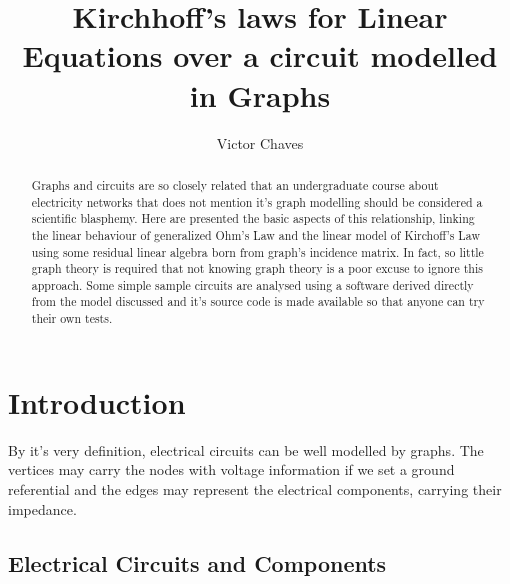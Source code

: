 \documentclass{comjnl}
\begin{document}
\title[Kirchhoff's laws for Linear Equations over a circuit modelled in Graphs]{Kirchhoff's laws for Linear Equations over a circuit modelled in Graphs}
\author{Victor Chaves}
 






\begin{abstract}
Graphs and circuits are so closely related that an undergraduate course about electricity networks that does not mention it's graph modelling should be considered a scientific blasphemy. Here are presented the basic aspects of this relationship, linking the linear behaviour of generalized Ohm's Law and the linear model of Kirchoff's Law using some residual linear algebra born from graph's incidence matrix. In fact, so little graph theory is required that not knowing graph theory is a poor excuse to ignore this approach. Some simple sample circuits are analysed using a software derived directly from the model discussed and it's source code is made available so that anyone can try their own tests.
\end{abstract}

\maketitle


\section{Introduction}
\label{Sec:Intro}

By it's very definition, electrical circuits can be well modelled by graphs. The vertices may carry the nodes with voltage information if we set a ground referential and the edges may represent the electrical components, carrying their impedance.

\subsection{Electrical Circuits and Components}
\label{Sec:Circuits&Components}
\end{document}
